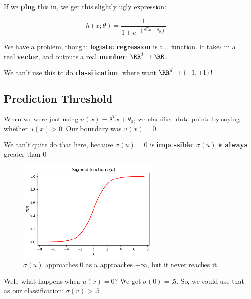         If we \textbf{plug} this in, we get this slightly ugly expression:
        
        \begin{equation*}
            h(x; \theta) = \frac{1}{1+e^{-(\theta^T x + \theta_0) } }
        \end{equation*}
        
        We have a problem, though: \textbf{logistic regression} is a...  function. It takes in a real \textbf{vector}, and outputs a real \textbf{number}: $\RR^d \rightarrow \RR$.
        
        We can't use this to do \textbf{classification}, where want $\RR^d \rightarrow \{-1,+1\}$!
        
    \subsection*{Prediction Threshold}
    
        When we were just using $u(x) = \theta^T x + \theta_0$, we classified data points by saying whether $u(x)>0$. Our boundary was $u(x)=0$.
        
        We can't quite do that here, because $\sigma(u)=0$ is \textbf{impossible}: $\sigma(u)$ is \textbf{always} greater than 0.
        
        \begin{figure}[H]
            \centering
            
            \includegraphics[width=70mm,scale=0.5]{images/classification_images/sigmoid_u.png}
            
            \caption*{$\sigma(u)$ approaches 0 as $u$ approaches $-\infty$, but it never reaches it.}
        \end{figure}
        
        Well, what happens when $u(x)=0$? We get $\sigma(0)=.5$. So, we could use that as our classification: $\sigma(u)>.5$
        
